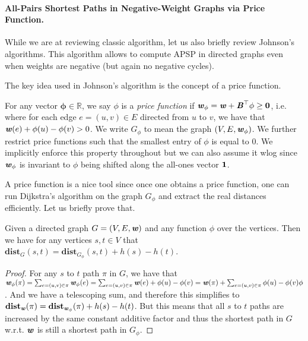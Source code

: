

\paragraph{All-Pairs Shortest Paths in Negative-Weight Graphs via Price Function.} While we are at reviewing classic algorithm, let us also briefly review Johnson's algorithms. This algorithm allows to compute APSP in directed graphs even when weights are negative (but again no negative cycles).

The key idea used in Johnson's algorithm is the concept of a price function.

\begin{definition}
For any vector $\mathbf{\phi} \in \mathbb{R}$, we say $\phi$ is a \emph{price function} if $\boldsymbol{\mathit{w}}_{\mathbf{\phi}} = \boldsymbol{\mathit{w}} + \boldsymbol{\mathit{B}}^{\top} \mathbf{\phi} \geq \boldsymbol{0}$, i.e. where for each edge $e = (u,v) \in E$ directed from $u$ to $v$, we have that $\boldsymbol{\mathit{w}}(e) + \phi(u) - \phi(v) > 0$. We write $G_{\phi}$ to mean the graph $(V, E, \boldsymbol{\mathit{w}}_{\phi})$. We further restrict price functions such that the smallest entry of $\phi$ is equal to $0$. We implicitly enforce this property throughout but we can also assume it wlog since $\boldsymbol{\mathit{w}}_{\mathbf{\phi}}$ is invariant to $\phi$ being shifted along the all-ones vector $\boldsymbol{1}$.  
\end{definition}

A price function is a nice tool since once one obtains a price function, one can run Dijkstra's algorithm on the graph $G_{\phi}$ and extract the real distances efficiently. Let us briefly prove that.

\begin{claim}
Given a directed graph $G = (V,E, \boldsymbol{\mathit{w}})$ and any function $\phi$ over the vertices. Then we have for any vertices $s,t \in V$ that $\mathbf{dist}_{G}(s,t) = \mathbf{dist}_{G_{\phi}}(s, t) + h(s) - h(t)$.  
\end{claim}
\begin{proof}
For any $s$ to $t$ path $\pi$ in $G$, we have that $\boldsymbol{\mathit{w}}_{\phi}(\pi) = \sum_{e = (u,v) \in \pi} \boldsymbol{\mathit{w}}_{\phi}(e) =  \sum_{e = (u,v) \in \pi}  \boldsymbol{\mathit{w}}(e) + \phi(u) - \phi(v) = \boldsymbol{\mathit{w}}(\pi) + \sum_{e = (u,v) \in \pi}  \phi(u) - \phi(v)  \mathbf{\phi}$. And we have a telescoping sum, and therefore this simplifies to $\mathbf{dist}_{\boldsymbol{\mathit{w}}}(\pi) = \mathbf{dist}_{\boldsymbol{\mathit{w}}_{\phi}}(\pi) + h(s) - h(t)$. But this means that all $s$ to $t$ paths are increased by the same constant additive factor and thus the shortest path in $G$ w.r.t. $\boldsymbol{\mathit{w}}$ is still a shortest path in $G_{\phi}$. 
\end{proof}

